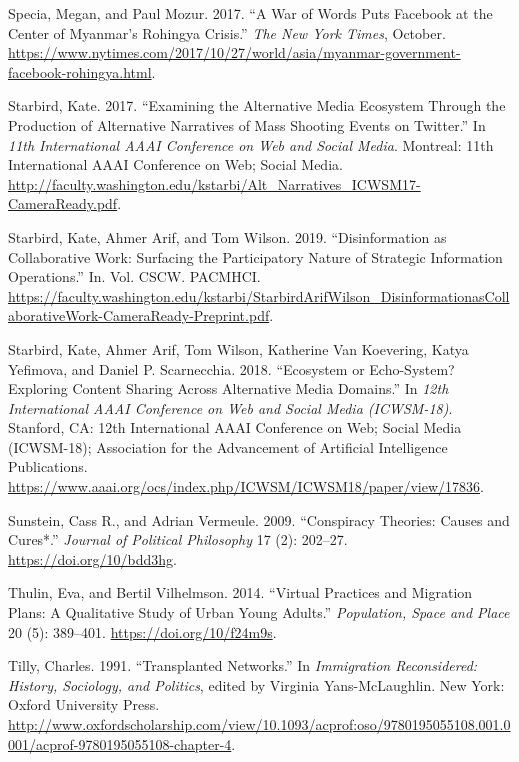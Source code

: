 \begin{cslreferences}
\leavevmode\hypertarget{ref-Specia2017War}{}%
Specia, Megan, and Paul Mozur. 2017. ``A War of Words Puts Facebook at
the Center of Myanmar's Rohingya Crisis.'' \emph{The New York Times},
October.
\url{https://www.nytimes.com/2017/10/27/world/asia/myanmar-government-facebook-rohingya.html}.

\leavevmode\hypertarget{ref-Starbird2017Examining}{}%
Starbird, Kate. 2017. ``Examining the Alternative Media Ecosystem
Through the Production of Alternative Narratives of Mass Shooting Events
on Twitter.'' In \emph{11th International AAAI Conference on Web and
Social Media}. Montreal: 11th International AAAI Conference on Web;
Social Media.
\url{http://faculty.washington.edu/kstarbi/Alt_Narratives_ICWSM17-CameraReady.pdf}.

\leavevmode\hypertarget{ref-KateStarbird2019Disinformation}{}%
Starbird, Kate, Ahmer Arif, and Tom Wilson. 2019. ``Disinformation as
Collaborative Work: Surfacing the Participatory Nature of Strategic
Information Operations.'' In. Vol. CSCW. PACMHCI.
\url{https://faculty.washington.edu/kstarbi/StarbirdArifWilson_DisinformationasCollaborativeWork-CameraReady-Preprint.pdf}.

\leavevmode\hypertarget{ref-Starbird2018Ecosystem}{}%
Starbird, Kate, Ahmer Arif, Tom Wilson, Katherine Van Koevering, Katya
Yefimova, and Daniel P. Scarnecchia. 2018. ``Ecosystem or Echo-System?
Exploring Content Sharing Across Alternative Media Domains.'' In
\emph{12th International AAAI Conference on Web and Social Media
(ICWSM-18)}. Stanford, CA: 12th International AAAI Conference on Web;
Social Media (ICWSM-18); Association for the Advancement of Artificial
Intelligence Publications.
\url{https://www.aaai.org/ocs/index.php/ICWSM/ICWSM18/paper/view/17836}.

\leavevmode\hypertarget{ref-Sunstein2009Conspiracy}{}%
Sunstein, Cass R., and Adrian Vermeule. 2009. ``Conspiracy Theories:
Causes and Cures*.'' \emph{Journal of Political Philosophy} 17 (2):
202--27. \url{https://doi.org/10/bdd3hg}.

\leavevmode\hypertarget{ref-Thulin2014Virtual}{}%
Thulin, Eva, and Bertil Vilhelmson. 2014. ``Virtual Practices and
Migration Plans: A Qualitative Study of Urban Young Adults.''
\emph{Population, Space and Place} 20 (5): 389--401.
\url{https://doi.org/10/f24m9s}.

\leavevmode\hypertarget{ref-Tilly1991Transplanted}{}%
Tilly, Charles. 1991. ``Transplanted Networks.'' In \emph{Immigration
Reconsidered: History, Sociology, and Politics}, edited by Virginia
Yans-McLaughlin. New York: Oxford University Press.
\url{http://www.oxfordscholarship.com/view/10.1093/acprof:oso/9780195055108.001.0001/acprof-9780195055108-chapter-4}.


\end{cslreferences}
